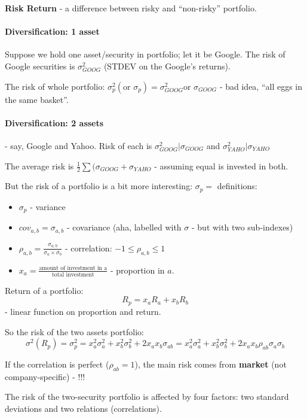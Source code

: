 \documentclass{scrartcl}
\begin{document}
{\bf Risk Return} - a difference between risky and ``non-risky'' portfolio. 

\paragraph{Diversification: 1 asset}
Suppose we hold one asset/security in portfolio; let it be Google. The risk of
Google securities is $\sigma_{GOOG}^2$ (STDEV on the Google's returns).

The risk of whole portfolio: $\sigma^2_p (\text{or }\sigma_p) =
\sigma^2_{GOOG}\text{or }\sigma_{GOOG}$
- bad idea, ``all eggs in the same basket''.

\paragraph{Diversification: 2  assets}

- say, Google and Yahoo. Risk of each is $\sigma^2_{GOOG}|\sigma_{GOOG}$ and $\sigma^2_{YAHO}|\sigma_{YAHO}$

The average risk is $\frac12 \sum (\sigma_{GOOG} + \sigma_{YAHO}$ 
- assuming equal is invested in both. 

But the risk of a portfolio is a bit more interesting: $\sigma_p = $
definitions:
\begin{itemize}
\item $\sigma_p$ - variance
\item $cov_{a, b} = \sigma_{a, b}$ - covariance (aha, labelled with $\sigma$ -
  but with two sub-indexes)
\item $\rho_{a, b} = \frac{ \sigma_{a, b}}{\sigma_a \times \sigma_b}$ -
  correlation: $-1 \leq \rho_{a,b} \leq 1$
\item $x_a = \frac{\text{amount of investment in a}}{\text{total investment}}$ -
  proportion in $a$.
\end{itemize}
Return of a portfolio:
 $$R_p = x_a R_a + x_b R_b$$ -  linear function on proportion and return.

So the risk of the two assets portfolio:
$$\sigma^2(R_p) = \sigma^2_p = x_a^2\sigma_a^2 + x_b^2\sigma_b^2 + 2 x_a x_b
\sigma_{ab} =  x_a^2\sigma_a^2 + x_b^2\sigma_b^2 + 2 x_a x_b
\rho_{ab}\sigma_a \sigma_b$$

If the correlation is perfect ($\rho_{ab} = 1$), the main risk comes from {\bf
  market} (not company-specific) - !!!

The risk of the two-security portfolio is affected by four factors: two standard
deviations and two relations (correlations).  
\end{document}

